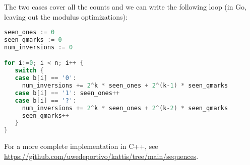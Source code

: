 The two cases cover all the counts and we can write the following loop (in Go, leaving out the modulus optimizations):

\newpage

\begin{fullwidth}

\begin{lstlisting}[language=Go, frame=single]  
seen_ones := 0
seen_qmarks := 0
num_inversions := 0

for i:=0; i < n; i++ {
   switch {
   case b[i] == '0': 
     num_inversions += 2^k * seen_ones + 2^(k-1) * seen_qmarks
   case b[i] == '1': seen_ones++
   case b[i] == '?': 
     num_inversions += 2^k * seen_ones + 2^(k-2) * seen_qmarks
     seen_qmarks++
   }
}          
\end{lstlisting}

\end{fullwidth}

For a more complete implementation in C++, see \\
\url{https://github.com/uwedeportivo/kattis/tree/main/sequences}.

